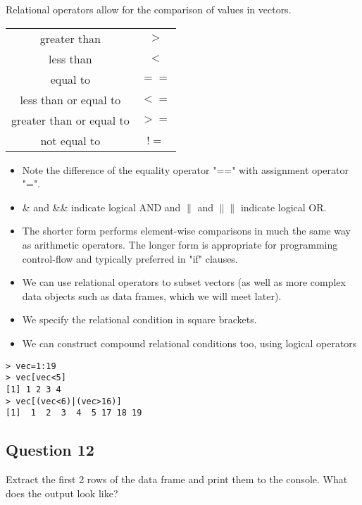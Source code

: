 \documentclass[12pt]{article}
\begin{document}
Relational operators allow for the comparison of values in vectors.
\begin{center}
\begin{tabular}{|c|c|}
  \hline
greater than &	$>$\\
less than&	$<$\\
equal to	&$==$\\
less than or equal to&	$<=$\\
greater than or equal to&	$>=$\\
not equal to	&$!=$\\
  \hline
\end{tabular}
\end{center}


\begin{itemize}
\item Note the difference of the equality operator "==" with assignment operator "=".

\item \& and \&\& indicate logical AND and $\|$ and $\|\|$ indicate logical OR.
\item The shorter form performs element-wise comparisons in much the same way as arithmetic operators. The longer form is appropriate for programming control-flow and typically preferred in "if" clauses.
\item We can use relational operators to subset vectors (as well as more complex data objects such as data frames, which we will meet later).
\item We specify the  relational condition in square brackets.
\item We can construct compound relational conditions too, using logical operators
\end{itemize}
\begin{framed}
\begin{verbatim}
> vec=1:19
> vec[vec<5]
[1] 1 2 3 4
> vec[(vec<6)|(vec>16)]
[1]  1  2  3  4  5 17 18 19
\end{verbatim}
\end{framed}





\newpage
\subsection*{Question 12}
\Large
Extract the first 2 rows of the data frame and print them to the console. What does the output look like?
\end{document}
